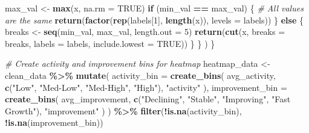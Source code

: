\documentclass[
]{article}
\newenvironment{Shaded}{\begin{snugshade}}{\end{snugshade}}
\newcommand{\AttributeTok}[1]{\textcolor[rgb]{0.13,0.29,0.53}{#1}}
\newcommand{\CommentTok}[1]{\textcolor[rgb]{0.56,0.35,0.01}{\textit{#1}}}
\newcommand{\ConstantTok}[1]{\textcolor[rgb]{0.56,0.35,0.01}{#1}}
\newcommand{\ControlFlowTok}[1]{\textcolor[rgb]{0.13,0.29,0.53}{\textbf{#1}}}
\newcommand{\DecValTok}[1]{\textcolor[rgb]{0.00,0.00,0.81}{#1}}
\newcommand{\FunctionTok}[1]{\textcolor[rgb]{0.13,0.29,0.53}{\textbf{#1}}}
\newcommand{\NormalTok}[1]{#1}
\newcommand{\OtherTok}[1]{\textcolor[rgb]{0.56,0.35,0.01}{#1}}
\newcommand{\SpecialCharTok}[1]{\textcolor[rgb]{0.81,0.36,0.00}{\textbf{#1}}}
\newcommand{\StringTok}[1]{\textcolor[rgb]{0.31,0.60,0.02}{#1}}
\begin{document}
\begin{Shaded}
\begin{Highlighting}[]
\NormalTok{                            max\_val }\OtherTok{\textless{}{-}} \FunctionTok{max}\NormalTok{(x, }\AttributeTok{na.rm =} \ConstantTok{TRUE}\NormalTok{)}
                            \ControlFlowTok{if}\NormalTok{ (min\_val }\SpecialCharTok{==}\NormalTok{ max\_val) \{}
                                \CommentTok{\# All values are the same}
                                \FunctionTok{return}\NormalTok{(}\FunctionTok{factor}\NormalTok{(}\FunctionTok{rep}\NormalTok{(labels[}\DecValTok{1}\NormalTok{], }\FunctionTok{length}\NormalTok{(x)), }\AttributeTok{levels =}\NormalTok{ labels))}
\NormalTok{                            \} }\ControlFlowTok{else}\NormalTok{ \{}
\NormalTok{                                breaks }\OtherTok{\textless{}{-}} \FunctionTok{seq}\NormalTok{(min\_val, max\_val, }\AttributeTok{length.out =} \DecValTok{5}\NormalTok{)}
                                \FunctionTok{return}\NormalTok{(}\FunctionTok{cut}\NormalTok{(x, }\AttributeTok{breaks =}\NormalTok{ breaks, }\AttributeTok{labels =}\NormalTok{ labels, }\AttributeTok{include.lowest =} \ConstantTok{TRUE}\NormalTok{))}
\NormalTok{                            \}}
\NormalTok{                        \}}
\NormalTok{                    )}
\NormalTok{                \}}

                \CommentTok{\# Create activity and improvement bins for heatmap}
\NormalTok{                heatmap\_data }\OtherTok{\textless{}{-}}\NormalTok{ clean\_data }\SpecialCharTok{\%\textgreater{}\%}
                    \FunctionTok{mutate}\NormalTok{(}
                        \AttributeTok{activity\_bin =} \FunctionTok{create\_bins}\NormalTok{(}
\NormalTok{                            avg\_activity,}
                            \FunctionTok{c}\NormalTok{(}\StringTok{"Low"}\NormalTok{, }\StringTok{"Med{-}Low"}\NormalTok{, }\StringTok{"Med{-}High"}\NormalTok{, }\StringTok{"High"}\NormalTok{),}
                            \StringTok{"activity"}
\NormalTok{                        ),}
                        \AttributeTok{improvement\_bin =} \FunctionTok{create\_bins}\NormalTok{(}
\NormalTok{                            avg\_improvement,}
                            \FunctionTok{c}\NormalTok{(}\StringTok{"Declining"}\NormalTok{, }\StringTok{"Stable"}\NormalTok{, }\StringTok{"Improving"}\NormalTok{, }\StringTok{"Fast Growth"}\NormalTok{),}
                            \StringTok{"improvement"}
\NormalTok{                        )}
\NormalTok{                    ) }\SpecialCharTok{\%\textgreater{}\%}
                    \FunctionTok{filter}\NormalTok{(}\SpecialCharTok{!}\FunctionTok{is.na}\NormalTok{(activity\_bin), }\SpecialCharTok{!}\FunctionTok{is.na}\NormalTok{(improvement\_bin))}


\end{Highlighting}
\end{Shaded}
\end{document}
